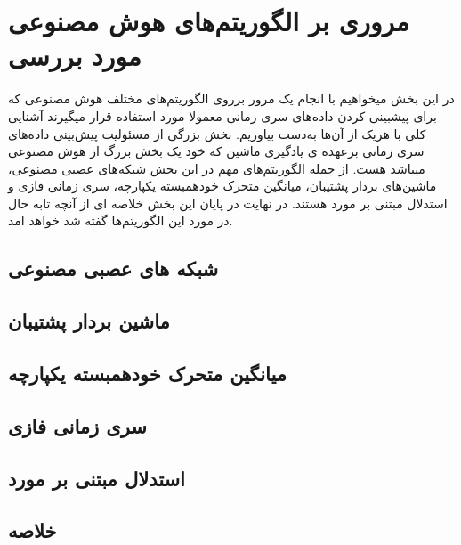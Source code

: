 \chapter{مروری بر الگوریتم‌های هوش مصنوعی مورد بررسی}

در این بخش میخواهیم با انجام یک مرور برروی الگوریتم‌های مختلف هوش مصنوعی که برای پیشبینی کردن داده‌های سری زمانی
معمولا مورد استفاده قرار میگیرند آشنایی کلی با هریک از آن‌ها به‌دست بیاوریم.
بخش بزرگی از مسئولیت پیش‌بینی داده‌های سری زمانی برعهده ی یادگیری ماشین که خود یک بخش بزرگ از هوش مصنوعی میباشد هست.
از جمله الگوریتم‌های مهم در این بخش شبکه‌های عصبی مصنوعی، ماشین‌های بردار پشتیبان، میانگین متحرک خودهمبسته یکپارچه، سری زمانی فازی و استدلال مبتنی بر مورد هستند. 
در نهایت در پایان این بخش خلاصه ای از آنچه تابه حال در مورد این الگوریتم‌ها گفته شد خواهد امد.

\section{شبکه های عصبی مصنوعی}
\section{ماشین بردار پشتیبان}
\section{میانگین متحرک خودهمبسته یکپارچه}
\section{سری زمانی فازی}
\section{استدلال مبتنی بر مورد}
\section{خلاصه}
